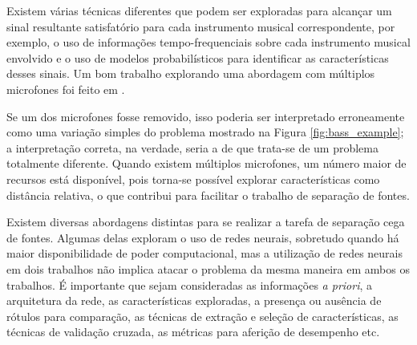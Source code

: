 Existem várias técnicas diferentes que podem ser exploradas para alcançar um sinal resultante satisfatório para cada instrumento musical correspondente, por exemplo, o uso de informações tempo-frequenciais sobre cada instrumento musical envolvido e o uso de modelos probabilísticos para identificar as características desses sinais. Um bom trabalho explorando uma abordagem com múltiplos microfones foi feito em \citep{7805139}.

Se um dos microfones fosse removido, isso poderia ser interpretado erroneamente como uma variação simples do problema mostrado na Figura \ref{fig:bass_example}; a interpretação correta, na verdade, seria a de que trata-se de um problema totalmente diferente. Quando existem múltiplos microfones, um número maior de recursos está disponível, pois torna-se possível explorar características como distância relativa, o que contribui para facilitar o trabalho de separação de fontes.




Existem diversas abordagens distintas para se realizar a tarefa de separação cega de fontes. Algumas delas exploram o uso de redes neurais, sobretudo quando há maior disponibilidade de poder computacional, mas a utilização de redes neurais em dois trabalhos não implica atacar o problema da mesma maneira em ambos os trabalhos. É importante que sejam consideradas as informações \textit{a priori}, a arquitetura da rede, as características exploradas, a presença ou ausência de rótulos para comparação, as técnicas de extração e seleção de características, as técnicas de validação cruzada, as métricas para aferição de desempenho etc.

